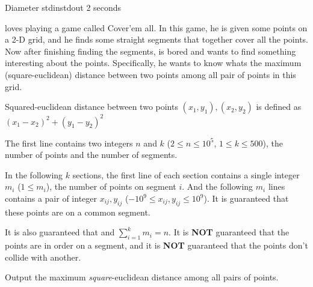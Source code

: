 \begin{problem}{Diameter}
{stdin}{stdout}
{2 seconds}{}{}

\pittoresque loves playing a game called Cover'em all. In this game, he is given some points on a 2-D grid, and he finds some straight segments that together cover all the points. Now after finishing finding the segments, \pittoresque is bored and wants to find something interesting about the points. Specifically, he wants to know whats the maximum (square-euclidean) distance between two points among all pair of points in this grid.

Squared-euclidean distance between two points $(x_1, y_1), (x_2, y_2)$ is defined as $(x_1 - x_2)^2 + (y_1 - y_2)^2$

\InputFile

The first line contains two integers $n$ and $k$ ($2 \le n \le 10^5$, $1 \le k \le 500$), the number of points and the number of segments.

In the following $k$ sections, the first line of each section contains a single integer $m_i$ ($1 \le m_i$), the number of points on segment $i$. And the following $m_i$ lines contains a pair of integer $x_{ij}, y_{ij}$ ($-10^9 \le x_{ij}, y_{ij} \le 10^9$). It is guaranteed that these points are on a common segment.

It is also guaranteed that and $\sum_{i = 1}^{k} m_i = n$. It is \textbf{NOT} guaranteed that the points are in order on a segment, and it is \textbf{NOT} guaranteed that the points don't collide with another. 

\OutputFile

Output the maximum \textit{square}-euclidean distance among all pairs of points. 

\Examples

\begin{example}
%
\end{example}

\begin{example}
%
\end{example}



\end{problem}
